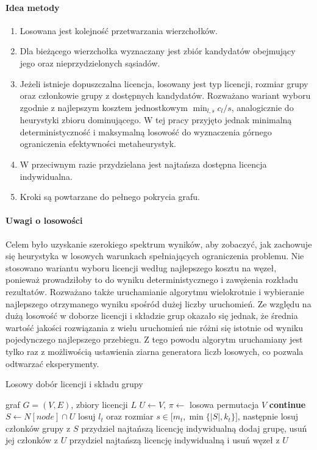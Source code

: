 \paragraph{Idea metody}
\begin{enumerate}
  \item Losowana jest kolejność przetwarzania wierzchołków.
  \item Dla bieżącego wierzchołka wyznaczany jest zbiór kandydatów obejmujący jego oraz nieprzydzielonych sąsiadów.
  \item Jeżeli istnieje dopuszczalna licencja, losowany jest typ licencji, rozmiar grupy oraz członkowie grupy z dostępnych kandydatów.
        Rozważano wariant wyboru zgodnie z najlepszym kosztem jednostkowym \(\min_{l,s} c_l/s\), analogicznie do heurystyki zbioru dominującego.
        W tej pracy przyjęto jednak minimalną deterministyczność i maksymalną losowość do wyznaczenia górnego ograniczenia efektywności metaheurystyk.
  \item W przeciwnym razie przydzielana jest najtańsza dostępna licencja indywidualna.
  \item Kroki są powtarzane do pełnego pokrycia grafu.
\end{enumerate}

\paragraph{Uwagi o losowości}
Celem było uzyskanie szerokiego spektrum wyników, aby zobaczyć, jak zachowuje się heurystyka w losowych warunkach spełniających ograniczenia problemu.
Nie stosowano wariantu wyboru licencji według najlepszego kosztu na węzeł, ponieważ prowadziłoby to do wyniku deterministycznego i zawężenia rozkładu rezultatów. 
Rozważano także uruchamianie algorytmu wielokrotnie i wybieranie najlepszego otrzymanego wyniku spośród dużej liczby uruchomień.
Ze względu na dużą losowość w doborze licencji i składzie grup okazało się jednak, że średnia wartość jakości rozwiązania z wielu uruchomień nie różni się istotnie od wyniku pojedynczego najlepszego przebiegu.
Z tego powodu algorytm uruchamiany jest tylko raz z możliwością ustawienia ziarna generatora liczb losowych, co pozwala odtwarzać eksperymenty.

\begin{algorithm}[H]
  \caption{Losowy dobór licencji i składu grupy}\label{alg:randomized}
  \begin{algorithmic}[1]
    \Require graf $G=(V,E)$, zbiory licencji $ L$
    \State $U\gets V$, $\pi\gets$ losowa permutacja $V$
     \textbf{continue} \EndIf
    \State $S\gets N[node]\cap U$
    \State losuj $l_t$ oraz rozmiar $s\in\bigl[m_t,\min\{|S|,k_t\}\bigr]$, następnie losuj członków grupy z $S$
    \Else
    \State przydziel najtańszą licencję indywidualną
    \EndIf
    \State dodaj grupę, usuń jej członków z $U$
    \EndFor
     przydziel najtańszą licencję indywidualną i usuń węzeł z $U$ \EndWhile
  \end{algorithmic}
\end{algorithm}

